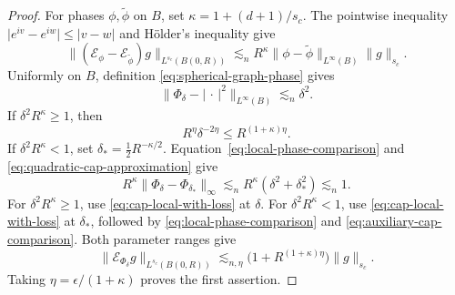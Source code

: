 \documentclass[11pt]{article}
\numberwithin{equation}{section}
\newcommand{\norm}[1]{\lVert #1\rVert}
\newcommand{\abs}[1]{\lvert #1\rvert}
\begin{document}
\begin{proof}
For phases \(\phi,\widetilde\phi\) on \(B\), set
\(\kappa=1+(d+1)/s_c\). The pointwise inequality
\(\abs{e^{iv}-e^{iw}}\le\abs{v-w}\) and H\"older's inequality give
\begin{equation}\label{eq:local-phase-comparison}
 \norm{(\mathcal E_\phi-\mathcal E_{\widetilde\phi})g}_{L^{s_c}(B(0,R))}
 \lesssim_n R^\kappa\norm{\phi-\widetilde\phi}_{L^\infty(B)}
                 \norm{g}_{s_c}.
\end{equation}
Uniformly on \(B\), definition \eqref{eq:spherical-graph-phase} gives
\begin{equation}\label{eq:quadratic-cap-approximation}
 \norm{\Phi_\delta-|\,\cdot\,|^2}_{L^\infty(B)}
 \lesssim_n\delta^2.
\end{equation}
If \(\delta^2R^\kappa\ge1\), then
\[
 R^\eta\delta^{-2\eta}\le R^{(1+\kappa)\eta}.
\]
If \(\delta^2R^\kappa<1\), set
\(\delta_*=\tfrac12R^{-\kappa/2}\). Equation~\eqref{eq:local-phase-comparison}
and \eqref{eq:quadratic-cap-approximation} give
\begin{equation}\label{eq:auxiliary-cap-comparison}
 R^\kappa\norm{\Phi_\delta-\Phi_{\delta_*}}_\infty
 \lesssim_n R^\kappa(\delta^2+\delta_*^2)\lesssim_n1.
\end{equation}
For \(\delta^2R^\kappa\ge1\), use \eqref{eq:cap-local-with-loss}
at \(\delta\). For \(\delta^2R^\kappa<1\), use
\eqref{eq:cap-local-with-loss} at \(\delta_*\), followed by
\eqref{eq:local-phase-comparison} and \eqref{eq:auxiliary-cap-comparison}.
Both parameter ranges give
\begin{equation}\label{eq:uniform-cap-local}
 \norm{\mathcal E_{\Phi_\delta}g}_{L^{s_c}(B(0,R))}
 \lesssim_{n,\eta}\bigl(1+R^{(1+\kappa)\eta}\bigr)\norm g_{s_c}.
\end{equation}
Taking \(\eta=\epsilon/(1+\kappa)\) proves the first assertion.


\end{proof}
\end{document}

